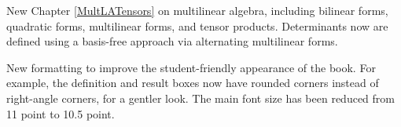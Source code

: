 \begin{Itemize}

\item
New Chapter \ref{MultLATensors} on multilinear algebra, including bilinear forms, quadratic forms, multilinear forms, and tensor products. Determinants now are defined using a basis-free approach via alternating multilinear forms.

\item
New formatting to improve the student-friendly appearance of the book. For example, the definition and result boxes now have rounded corners instead of right-angle corners, for a gentler look. The main font size has been reduced from 11 point to 10.5 point.

\end{Itemize}


